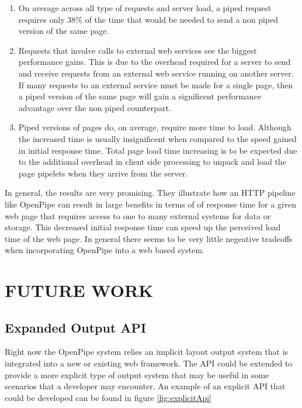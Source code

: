 \documentclass[12pt]{report}
\begin{document}
\begin{enumerate}
\item On average across all type of requests and server load, a piped request requires only 38\% of the time that would be needed to send a non piped version of the same page.
\item Requests that involve calls to external web services see the biggest performance gains. This is due to the overhead required for a server to send and receive requests from an external web service running on another server. If many requests to an external service must be made for a single page, then a piped version of the same page will gain a significent performance advantage over the non piped counterpart.
\item Piped versions of pages do, on average, require more time to load. Although the increased time is usually insignificent when compared to the speed gained in initial response time. Total page load time increasing is to be expected due to the additional overhead in client side processing to unpack and load the page pipelets when they arrive from the server. 
\end{enumerate}

In general, the results are very promising.  They illustrate how an HTTP pipeline like OpenPipe can result in large benefits in terms of of response time for a given web page that requires access to one to many external systems for data or storage. This decreased initial response time can speed up the perceived load time of the web page. In general there seems to be very little negeative tradeoffs when incorporating OpenPipe into a web based system.

\chapter{FUTURE WORK}

\section{Expanded Output API}
Right now the OpenPipe system relies an implicit layout output system that is integrated into a new or existing web framework. The API could be extended to provide a more explicit type of output system that may be useful in some scenarios that a developer may encounter. An example of an explicit API that could  be developed can be found in figure \ref{fig:explicitApi}
\end{document}
